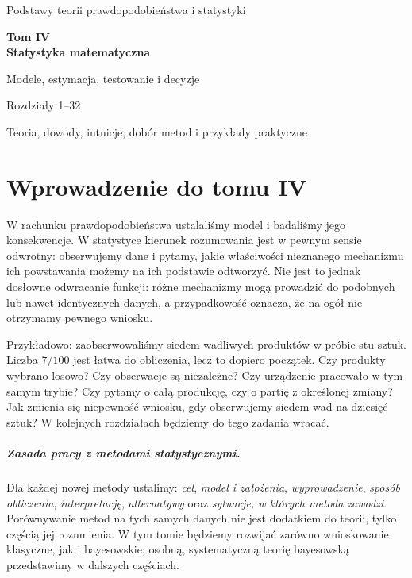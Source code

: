 \documentclass[11pt,a4paper,oneside]{report}
\numberwithin{equation}{chapter}
\theoremstyle{plain}
\theoremstyle{definition}
\theoremstyle{remark}
\begin{document}
\hypersetup{pageanchor=false}
\begin{titlepage}
\centering\vspace*{3.2cm}
{\Large Podstawy teorii prawdopodobieństwa i statystyki\par}
\vspace{1.1cm}
{\Huge\bfseries Tom IV\\[0.25cm]Statystyka matematyczna\par}
\vspace{0.8cm}
{\LARGE Modele, estymacja, testowanie i decyzje\par}
\vspace{0.7cm}
{\Large Rozdziały 1--32\par}
\vfill
{\large Teoria, dowody, intuicje, dobór metod i przykłady praktyczne\par}
\vspace{1cm}
\end{titlepage}
\hypersetup{pageanchor=true}
\tableofcontents
\chapter*{Wprowadzenie do tomu IV}
W rachunku prawdopodobieństwa ustalaliśmy model i badaliśmy jego konsekwencje. W statystyce kierunek rozumowania jest w pewnym sensie odwrotny: obserwujemy dane i pytamy, jakie właściwości nieznanego mechanizmu ich powstawania możemy na ich podstawie odtworzyć. Nie jest to jednak dosłowne odwracanie funkcji: różne mechanizmy mogą prowadzić do podobnych lub nawet identycznych danych, a przypadkowość oznacza, że na ogół nie otrzymamy pewnego wniosku.

Przykładowo: zaobserwowaliśmy siedem wadliwych produktów w próbie stu sztuk. Liczba $7/100$ jest łatwa do obliczenia, lecz to dopiero początek. Czy produkty wybrano losowo? Czy obserwacje są niezależne? Czy urządzenie pracowało w tym samym trybie? Czy pytamy o całą produkcję, czy o partię z określonej zmiany? Jak zmienia się niepewność wniosku, gdy obserwujemy siedem wad na dziesięć sztuk? W kolejnych rozdziałach będziemy do tego zadania wracać.

\paragraph{Zasada pracy z metodami statystycznymi.}
Dla każdej nowej metody ustalimy: \emph{cel}, \emph{model i założenia}, \emph{wyprowadzenie}, \emph{sposób obliczenia}, \emph{interpretację}, \emph{alternatywy} oraz \emph{sytuacje, w których metoda zawodzi}. Porównywanie metod na tych samych danych nie jest dodatkiem do teorii, tylko częścią jej rozumienia. W tym tomie będziemy rozwijać zarówno wnioskowanie klasyczne, jak i bayesowskie; osobną, systematyczną teorię bayesowską przedstawimy w dalszych częściach.
\end{document}
